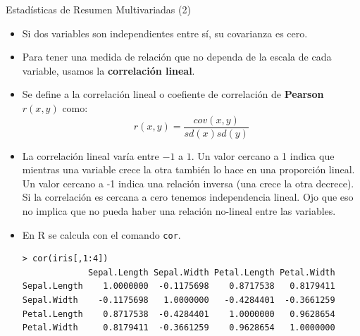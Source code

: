 \documentclass[handout]{beamer}
\begin{document}
\begin{frame}[fragile]{Estadísticas de Resumen Multivariadas (2)}
\scriptsize{
\begin{itemize}
 \item Si dos variables son independientes entre sí, su covarianza es cero.
 \item Para tener una medida de relación que no dependa de la escala de cada variable, usamos la \textbf{correlación lineal}.
 \item Se define a la correlación lineal o coefiente de correlación de \textbf{Pearson} $r(x,y)$ como:
 \begin{displaymath}
  r(x,y)=\frac{cov(x,y)}{sd(x)sd(y)}
 \end{displaymath}
\item La correlación lineal varía entre $-1$ a $1$. Un valor cercano a 1 indica que mientras una variable crece  la otra también lo hace en una proporción lineal. Un valor cercano a -1 indica una relación inversa (una crece la otra decrece). Si la correlación es cercana a cero tenemos independencia lineal. Ojo que eso no implica que no pueda haber una relación no-lineal entre las variables.
\item En R se calcula con el comando \verb+cor+.
\begin{verbatim}
> cor(iris[,1:4])
             Sepal.Length Sepal.Width Petal.Length Petal.Width
Sepal.Length    1.0000000  -0.1175698    0.8717538   0.8179411
Sepal.Width    -0.1175698   1.0000000   -0.4284401  -0.3661259
Petal.Length    0.8717538  -0.4284401    1.0000000   0.9628654
Petal.Width     0.8179411  -0.3661259    0.9628654   1.0000000
\end{verbatim}

 
 
\end{itemize}



}
\end{frame}
\end{document}
